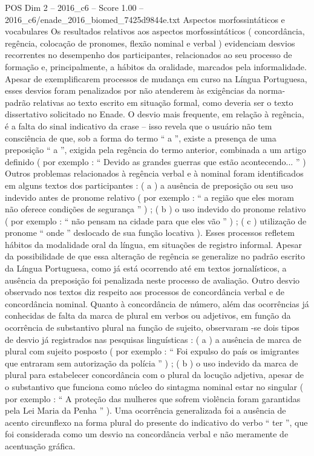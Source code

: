 \begin{textsample}{POS Dim 2 – 2016\_c6 – Score 1.00 – 2016\_c6/enade\_2016\_biomed\_7425d9844e.txt}
Aspectos morfossintáticos e vocabulares Os resultados relativos aos aspectos morfossintáticos ( concordância, regência, colocação de pronomes, flexão nominal e verbal ) evidenciam desvios recorrentes no desempenho dos participantes, relacionados ao seu processo de formação e, principalmente, a hábitos da oralidade, marcados pela informalidade.
Apesar de exemplificarem processos de mudança em curso na Língua Portuguesa, esses desvios foram penalizados por não atenderem às exigências da norma-padrão relativas ao texto escrito em situação formal, como deveria ser o texto dissertativo solicitado no Enade.
O desvio mais frequente, em relação à regência, é a falta do sinal indicativo da crase – isso revela que o usuário não tem consciência de que, sob a forma do termo “ a ”, existe a presença de uma preposição “ a ”, exigida pela regência do termo anterior, combinada a um artigo definido ( por exemplo : “ Devido as grandes guerras que estão acontecendo... ” ) Outros problemas relacionados à regência verbal e à nominal foram identificados em alguns textos dos participantes : ( a ) a ausência de preposição ou seu uso indevido antes de pronome relativo ( por exemplo : “ a região que eles moram não oferece condições de segurança ” ) ; ( b ) o uso indevido do pronome relativo ( por exemplo : “ não pensam na cidade para que eles vão ” ) ; ( c ) utilização de pronome “ onde ” deslocado de sua função locativa ).
Esses processos refletem hábitos da modalidade oral da língua, em situações de registro informal.
Apesar da possibilidade de que essa alteração de regência se generalize no padrão escrito da Língua Portuguesa, como já está ocorrendo até em textos jornalísticos, a ausência da preposição foi penalizada neste processo de avaliação.
Outro desvio observado nos textos diz respeito aos processos de concordância verbal e de concordância nominal.
Quanto à concordância de número, além das ocorrências já conhecidas de falta da marca de plural em verbos ou adjetivos, em função da ocorrência de substantivo plural na função de sujeito, observaram -se dois tipos de desvio já registrados nas pesquisas linguísticas : ( a ) a ausência de marca de plural com sujeito posposto ( por exemplo : “ Foi expulso do país os imigrantes que entraram sem autorização da polícia ” ) ; ( b ) o uso indevido da marca de plural para estabelecer concordância com o plural da locução adjetiva, apesar de o substantivo que funciona como núcleo do sintagma nominal estar no singular ( por exemplo : “ A proteção das mulheres que sofrem violência foram garantidas pela Lei Maria da Penha ” ).
Uma ocorrência generalizada foi a ausência de acento circunflexo na forma plural do presente do indicativo do verbo “ ter ”, que foi considerada como um desvio na concordância verbal e não meramente de acentuação gráfica.

\end{textsample}
